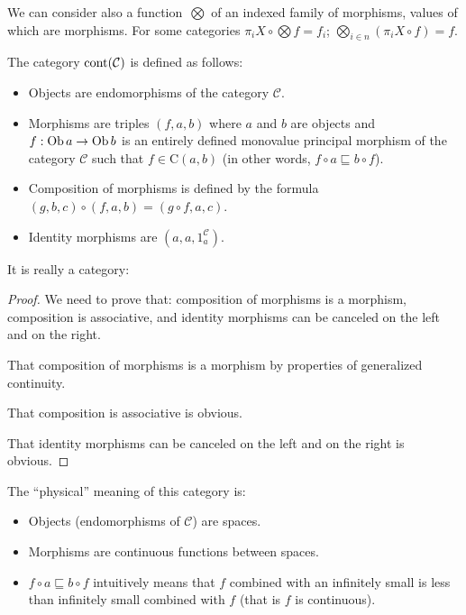 \begin{rem}
We can consider also a function~$\bigotimes$ of an indexed family of morphisms, values of which are morphisms. For some categories $\pi_i X \circ
\bigotimes f = f_i$; $\bigotimes_{i \in n} (\pi_i X \circ f) = f$. 
\end{rem}

\begin{defn}
  The category $\operatorname{cont} (\mathcal{C})$ is defined as follows:
  \begin{itemize}
    \item Objects are endomorphisms of the category $\mathcal{C}$.
    
    \item Morphisms are triples $(f , a , b)$ where $a$ and $b$ are objects
    and $f : \operatorname{Ob} a \rightarrow \operatorname{Ob} b$ is an entirely defined
    monovalue principal morphism of the category $\mathcal{C}$ such that $f
    \in \mathrm{C} (a , b)$ (in other words, $f \circ a \sqsubseteq b \circ
    f$).
    
    \item Composition of morphisms is defined by the formula $(g , b , c)
    \circ (f , a , b) = (g \circ f , a , c)$.
    
    \item Identity morphisms are $(a , a , 1^{\mathcal{C}}_a)$.
  \end{itemize}
\end{defn}

It is really a category:

\begin{proof}
  We need to prove that: composition of morphisms is a morphism, composition
  is associative, and identity morphisms can be canceled on the left and on
  the right.
  
  That composition of morphisms is a morphism by properties of generalized
  continuity.
  
  That composition is associative is obvious.
  
  That identity morphisms can be canceled on the left and on the right is
  obvious.
\end{proof}

\begin{rem}
  The ``physical'' meaning of this category is:
  \begin{itemize}
    \item Objects (endomorphisms of $\mathcal{C}$) are spaces.
    
    \item Morphisms are continuous functions between spaces.
    
    \item $f \circ a \sqsubseteq b \circ f$ intuitively means that $f$
    combined with an infinitely small is less than infinitely small combined
    with $f$ (that is $f$ is continuous).
  \end{itemize}
\end{rem}

